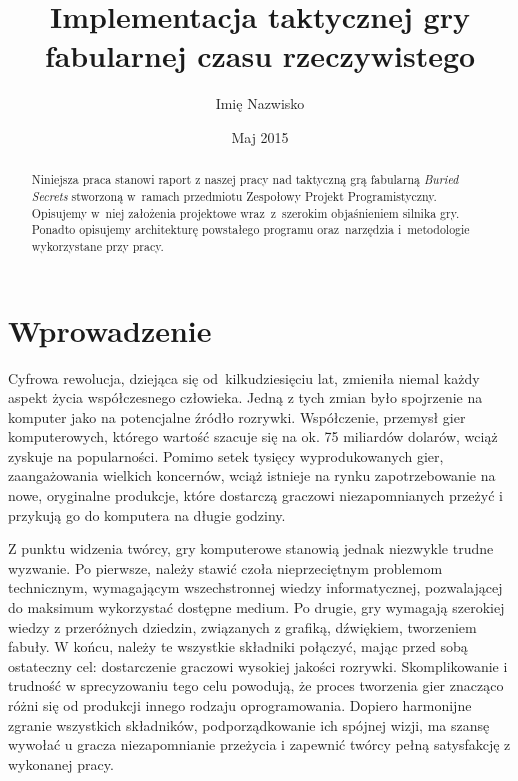 \documentclass[licencjacka]{pracamgr}
\author	{Imię Nazwisko}
\title{Implementacja taktycznej gry fabularnej czasu rzeczywistego}
\date{Maj 2015}
\begin{document}
\maketitle

\begin{abstract}
  Niniejsza praca stanowi raport z naszej pracy nad taktyczną grą fabularną \emph{Buried Secrets} stworzoną w~ramach przedmiotu Zespołowy Projekt
  Programistyczny. Opisujemy w~niej założenia projektowe wraz~z~szerokim objaśnieniem silnika gry. Ponadto opisujemy architekturę 
  powstałego programu oraz~narzędzia i~metodologie wykorzystane przy pracy.
\end{abstract}

\tableofcontents

\chapter*{Wprowadzenie}
  Cyfrowa rewolucja, dziejąca się od~kilkudziesięciu lat, zmieniła niemal każdy aspekt życia współczesnego człowieka.
  Jedną z tych zmian było spojrzenie na komputer jako na potencjalne źródło rozrywki. Współczenie, przemysł
  gier komputerowych, którego wartość szacuje się na ok. 75 miliardów dolarów\cite{CA}, wciąż zyskuje na popularności.
  Pomimo setek tysięcy wyprodukowanych gier, zaangażowania wielkich koncernów, wciąż istnieje na rynku zapotrzebowanie
  na nowe, oryginalne produkcje, które dostarczą graczowi niezapomnianych przeżyć i przykują go do komputera na długie godziny.

  Z punktu widzenia twórcy, gry komputerowe stanowią jednak niezwykle trudne wyzwanie. Po pierwsze, należy stawić czoła
  nieprzeciętnym problemom technicznym, wymagającym wszechstronnej wiedzy informatycznej, pozwalającej do maksimum wykorzystać
  dostępne medium. Po drugie, gry wymagają szerokiej wiedzy z przeróżnych dziedzin, związanych z
  grafiką, dźwiękiem, tworzeniem fabuły. W końcu, należy te wszystkie składniki połączyć, mając przed sobą ostateczny cel: dostarczenie
  graczowi wysokiej jakości rozrywki. Skomplikowanie i trudność w sprecyzowaniu tego celu powodują, że proces tworzenia gier
  znacząco różni się od produkcji innego rodzaju oprogramowania. Dopiero harmonijne zgranie wszystkich składników, podporządkowanie
  ich spójnej wizji, ma szansę wywołać u gracza niezapomnianie przeżycia i zapewnić twórcy pełną satysfakcję z wykonanej pracy.
\end{document}
